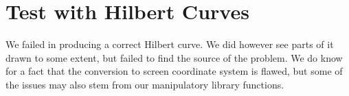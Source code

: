 \section{Test with Hilbert Curves}
We failed in producing a correct Hilbert curve. We did however see parts of it
drawn to some extent, but failed to find the source of the problem. We do know
for a fact that the conversion to screen coordinate system is flawed, but some
of the issues may also stem from our manipulatory library functions.

